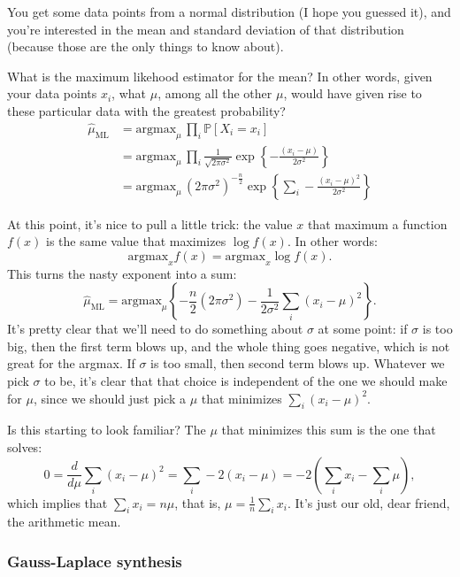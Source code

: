\documentclass{book}
\begin{document}
You get some data points from a normal distribution (I hope you guessed
it), and you're interested in the mean and standard deviation of that
distribution (because those are the only things to know about).

What is the maximum likehood estimator for the mean? In other words,
given your data points \(x_i\), what \(\mu\), among all the other
\(\mu\), would have given rise to these particular data with the
greatest probability? \[
\begin{aligned}
\hat{\mu}_\mathrm{ML}
  &= \mathrm{argmax}_\mu \, \prod_i \mathbb{P}[X_i = x_i] \\
  &= \mathrm{argmax}_\mu \, \prod_i \frac{1}{\sqrt{2 \pi \sigma^2}} \exp\left\{ -\frac{(x_i - \mu)}{2\sigma^2} \right\} \\
  &= \mathrm{argmax}_\mu \, \left(2\pi\sigma^2\right)^{-\frac{n}{2}} \exp\left\{ \sum_i -\frac{(x_i-\mu)^2}{2\sigma^2} \right\}
\end{aligned}
\]

At this point, it's nice to pull a little trick: the value \(x\) that
maximum a function \(f(x)\) is the same value that maximizes
\(\log f(x)\). In other words: \[
\mathrm{argmax}_x f(x) = \mathrm{argmax}_x \log f(x).
\] This turns the nasty exponent into a sum: \[
\hat{\mu}_\mathrm{ML} = \mathrm{argmax}_\mu \left\{ -\frac{n}{2} \left(2 \pi \sigma^2\right) - \frac{1}{2\sigma^2} \sum_i (x_i-\mu)^2 \right\}.
\] It's pretty clear that we'll need to do something about \(\sigma\) at
some point: if \(\sigma\) is too big, then the first term blows up, and
the whole thing goes negative, which is not great for the argmax. If
\(\sigma\) is too small, then second term blows up. Whatever we pick
\(\sigma\) to be, it's clear that that choice is independent of the one
we should make for \(\mu\), since we should just pick a \(\mu\) that
minimizes \(\sum_i (x_i - \mu)^2\).

Is this starting to look familiar? The \(\mu\) that minimizes this sum
is the one that solves: \[
0 = \frac{d}{d\mu} \sum_i (x_i - \mu)^2 = \sum_i -2 (x_i - \mu) = -2 \left( \sum_i x_i - \sum_i \mu \right),
\] which implies that \(\sum_i x_i = n\mu\), that is,
\(\mu = \tfrac{1}{n} \sum_i x_i\). It's just our old, dear friend, the
arithmetic mean.

\subsubsection{Gauss-Laplace synthesis}\label{gauss-laplace-synthesis}
\end{document}
